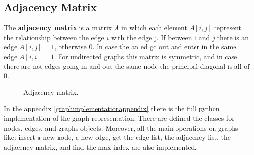 \subsection{Adjacency Matrix}
The \textbf{adjacency matrix} is a matrix \(A\) in which each element \(A[i, j]\) represent the relationship between the edge \(i\) with the edge \(j\). If between \(i\) and \(j\) there is an edge \(A[i, j] = 1\), otherwise \(0\). In case the an ed go out and enter in the same edge \(A[i, i] = 1\). For undirected graphs this matrix is symmetric, and in case there are not edges going in and out the same node the principal diagonal is all of \(0\).

\begin{figure}[H]
\centering
{}  
\caption[Adjacency matrix.]{Adjacency matrix.}
\label{graphs_5}
\end{figure}

In the appendix \ref{graphimplementationappendix} there is the full python implementation of the graph representation. There are defined the classes for nodes, edges, and graphs objects. Moreover, all the main operations on graphs like: insert a new node, a new edge, get the edge list, the adjacency list, the adjacency matrix, and find the max index are also implemented.

